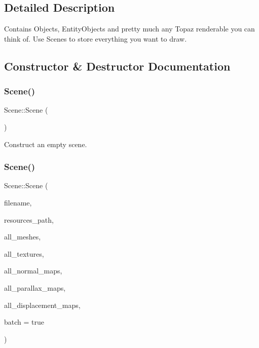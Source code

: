 \subsection{Detailed Description}
Contains Objects, Entity\+Objects and pretty much any Topaz renderable you can think of. Use Scenes to store everything you want to draw. 

\subsection{Constructor \& Destructor Documentation}
\mbox{\label{class_scene_ad10176d75a9cc0da56626f682d083507}} 
\subsubsection{\texorpdfstring{Scene()}{Scene()}\hspace{0.1cm}{\footnotesize\ttfamily [1/2]}}
{\footnotesize\ttfamily Scene\+::\+Scene (\begin{DoxyParamCaption}{ }\end{DoxyParamCaption})}

Construct an empty scene. \mbox{\label{class_scene_a5311ceba0e507f805d3c5592155880fc}} 
\subsubsection{\texorpdfstring{Scene()}{Scene()}\hspace{0.1cm}{\footnotesize\ttfamily [2/2]}}
{\footnotesize\ttfamily Scene\+::\+Scene (\begin{DoxyParamCaption}\item[{std\+::string}]{filename,  }\item[{std\+::string}]{resources\+\_\+path,  }\item[{const std\+::vector$<$ std\+::unique\+\_\+ptr$<$ \mbox{\hyperlink{class_mesh}{Mesh}} $>$$>$ \&}]{all\+\_\+meshes,  }\item[{const std\+::vector$<$ std\+::unique\+\_\+ptr$<$ \mbox{\hyperlink{class_texture}{Texture}} $>$$>$ \&}]{all\+\_\+textures,  }\item[{const std\+::vector$<$ std\+::unique\+\_\+ptr$<$ \mbox{\hyperlink{class_normal_map}{Normal\+Map}} $>$$>$ \&}]{all\+\_\+normal\+\_\+maps,  }\item[{const std\+::vector$<$ std\+::unique\+\_\+ptr$<$ \mbox{\hyperlink{class_parallax_map}{Parallax\+Map}} $>$$>$ \&}]{all\+\_\+parallax\+\_\+maps,  }\item[{const std\+::vector$<$ std\+::unique\+\_\+ptr$<$ \mbox{\hyperlink{class_displacement_map}{Displacement\+Map}} $>$$>$ \&}]{all\+\_\+displacement\+\_\+maps,  }\item[{bool}]{batch = {\ttfamily true} }\end{DoxyParamCaption})}

